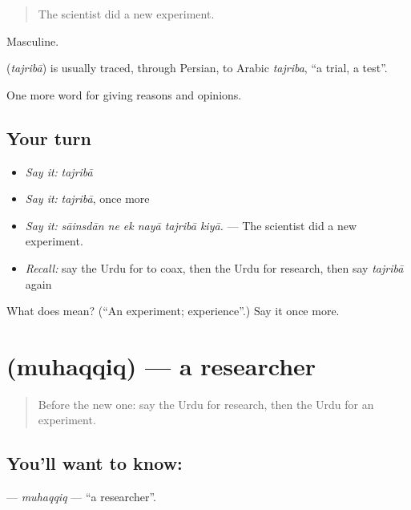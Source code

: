 \begin{quote}
The scientist did a new experiment.
\end{quote}

Masculine.

\begin{cousinweb}
\textbf{} (\emph{tajribā}) is usually traced, through Persian, to Arabic \emph{tajriba}, \textquotedblleft{}a trial, a test\textquotedblright{}.
\end{cousinweb}

\begin{grammarlens}[title={What you've built}]
One more word for giving reasons and opinions.
\end{grammarlens}

\subsection*{Your turn}
\begin{itemize}
\raggedright
  \item \emph{Say it:} \emph{tajribā}
  \item \emph{Say it:} \emph{tajribā}, once more
  \item \emph{Say it:} \emph{sāinsdān ne ek nayā tajribā kiyā.} — The scientist did a new experiment.
  \item \emph{Recall:} say the Urdu for to coax, then the Urdu for research, then say \emph{tajribā} again
\end{itemize}

\begin{tcolorbox}[breakable,colback=teal!4,colframe=teal!35!black,title={Before you move on}]
What does  mean? (\textquotedblleft{}An experiment; experience\textquotedblright{}.) Say it once more.
\end{tcolorbox}
\section[\texorpdfstring{\ur{محقق} (muhaqqiq)}{محقق (muhaqqiq)}]{ (muhaqqiq) — a researcher}

\label{lesson:UR-C349-muhaqqiq}



\begin{quote}
Before the new one: say the Urdu for research, then the Urdu for an experiment.
\end{quote}

\subsection*{You'll want to know: }
\textbf{} — \emph{muhaqqiq} — \textquotedblleft{}a researcher\textquotedblright{}.


